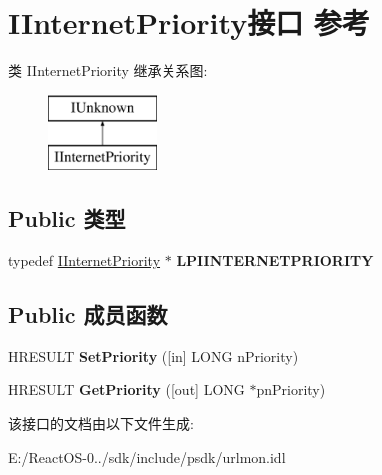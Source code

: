 \hypertarget{interface_i_internet_priority}{}\section{I\+Internet\+Priority接口 参考}
\label{interface_i_internet_priority}
类 I\+Internet\+Priority 继承关系图\+:\begin{figure}[H]
\begin{center}
\leavevmode
\includegraphics[height=2.000000cm]{interface_i_internet_priority}
\end{center}
\end{figure}
\subsection*{Public 类型}
\begin{DoxyCompactItemize}
\item 
\mbox{\label{interface_i_internet_priority_abb5089f92fc7eaba3774bc5130c440a2}} 
typedef \hyperlink{interface_i_internet_priority}{I\+Internet\+Priority} $\ast$ {\bfseries L\+P\+I\+I\+N\+T\+E\+R\+N\+E\+T\+P\+R\+I\+O\+R\+I\+TY}
\end{DoxyCompactItemize}
\subsection*{Public 成员函数}
\begin{DoxyCompactItemize}
\item 
\mbox{\label{interface_i_internet_priority_a4fa59493d2a6aad330aa06ecfd021b8b}} 
H\+R\+E\+S\+U\+LT {\bfseries Set\+Priority} (\mbox{[}in\mbox{]} L\+O\+NG n\+Priority)
\item 
\mbox{\label{interface_i_internet_priority_a578206c7c24eb844db71a087a1080f2f}} 
H\+R\+E\+S\+U\+LT {\bfseries Get\+Priority} (\mbox{[}out\mbox{]} L\+O\+NG $\ast$pn\+Priority)
\end{DoxyCompactItemize}


该接口的文档由以下文件生成\+:\begin{DoxyCompactItemize}
\item 
E\+:/\+React\+O\+S-\/0../sdk/include/psdk/urlmon.\+idl\end{DoxyCompactItemize}
